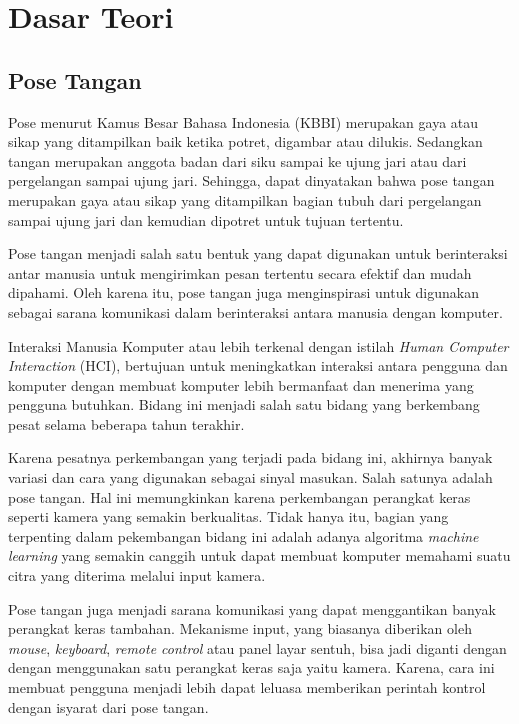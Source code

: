 \section{Dasar Teori}
\label{sec:dasarteori}

\subsection{Pose Tangan}

Pose menurut Kamus Besar Bahasa Indonesia (KBBI) merupakan gaya atau sikap yang ditampilkan baik ketika potret, digambar atau dilukis. Sedangkan tangan merupakan anggota badan dari siku sampai ke ujung jari atau dari pergelangan sampai ujung jari. Sehingga, dapat dinyatakan bahwa pose tangan merupakan gaya atau sikap yang ditampilkan bagian tubuh dari pergelangan sampai ujung jari dan kemudian dipotret untuk tujuan tertentu.

Pose tangan menjadi salah satu bentuk yang dapat digunakan untuk berinteraksi antar manusia untuk mengirimkan pesan tertentu secara efektif dan mudah dipahami. Oleh karena itu, pose tangan juga menginspirasi untuk digunakan sebagai sarana komunikasi dalam berinteraksi antara manusia dengan komputer. 

Interaksi Manusia Komputer atau lebih terkenal dengan istilah \emph{Human Computer Interaction} (HCI), bertujuan untuk meningkatkan interaksi antara pengguna dan komputer dengan membuat komputer lebih bermanfaat dan menerima yang pengguna butuhkan. Bidang ini menjadi salah satu bidang yang berkembang pesat selama beberapa tahun terakhir.

Karena pesatnya perkembangan yang terjadi pada bidang ini, akhirnya banyak variasi dan cara yang digunakan sebagai sinyal masukan. Salah satunya adalah pose tangan. Hal ini memungkinkan karena perkembangan perangkat keras seperti kamera yang semakin berkualitas. Tidak hanya itu, bagian yang terpenting dalam pekembangan bidang ini adalah adanya algoritma \emph{machine learning} yang semakin canggih untuk dapat membuat komputer memahami suatu citra yang diterima melalui input kamera. 

Pose tangan juga menjadi sarana komunikasi yang dapat menggantikan banyak perangkat keras tambahan. Mekanisme input, yang biasanya diberikan oleh \emph{mouse}, \emph{keyboard}, \emph{remote control} atau panel layar sentuh, bisa jadi diganti dengan dengan menggunakan satu perangkat keras saja yaitu kamera. Karena, cara ini membuat pengguna menjadi lebih dapat leluasa memberikan perintah kontrol dengan isyarat dari pose tangan. 

